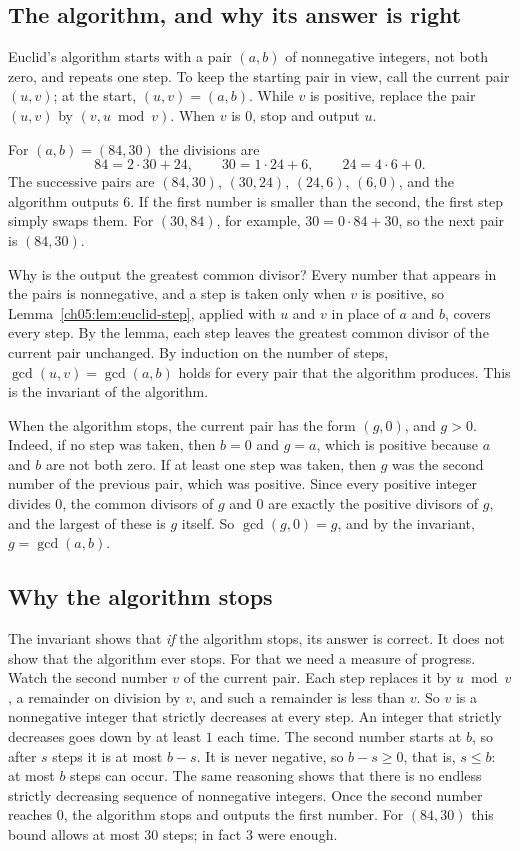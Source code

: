 \subsection*{The algorithm, and why its answer is right}
Euclid's algorithm starts with a pair $(a,b)$ of nonnegative integers, not both zero, and repeats one step. To keep the starting pair in view, call the current pair $(u,v)$; at the start, $(u,v)=(a,b)$. While $v$ is positive, replace the pair $(u,v)$ by $(v,u\bmod v)$. When $v$ is $0$, stop and output $u$.

For $(a,b)=(84,30)$ the divisions are
\[
84=2\cdot30+24,\qquad30=1\cdot24+6,\qquad24=4\cdot6+0.
\]
The successive pairs are $(84,30)$, $(30,24)$, $(24,6)$, $(6,0)$, and the algorithm outputs $6$. If the first number is smaller than the second, the first step simply swaps them. For $(30,84)$, for example, $30=0\cdot84+30$, so the next pair is $(84,30)$.

Why is the output the greatest common divisor? Every number that appears in the pairs is nonnegative, and a step is taken only when $v$ is positive, so Lemma~\ref{ch05:lem:euclid-step}, applied with $u$ and $v$ in place of $a$ and $b$, covers every step. By the lemma, each step leaves the greatest common divisor of the current pair unchanged. By induction on the number of steps, $\gcd(u,v)=\gcd(a,b)$ holds for every pair that the algorithm produces. This is the invariant of the algorithm.

When the algorithm stops, the current pair has the form $(g,0)$, and $g>0$. Indeed, if no step was taken, then $b=0$ and $g=a$, which is positive because $a$ and $b$ are not both zero. If at least one step was taken, then $g$ was the second number of the previous pair, which was positive. Since every positive integer divides $0$, the common divisors of $g$ and $0$ are exactly the positive divisors of $g$, and the largest of these is $g$ itself. So $\gcd(g,0)=g$, and by the invariant, $g=\gcd(a,b)$.

\subsection*{Why the algorithm stops}
The invariant shows that \emph{if} the algorithm stops, its answer is correct. It does not show that the algorithm ever stops. For that we need a measure of progress. Watch the second number $v$ of the current pair. Each step replaces it by $u\bmod v$, a remainder on division by $v$, and such a remainder is less than $v$. So $v$ is a nonnegative integer that strictly decreases at every step. An integer that strictly decreases goes down by at least $1$ each time. The second number starts at $b$, so after $s$ steps it is at most $b-s$. It is never negative, so $b-s\ge0$, that is, $s\le b$: at most $b$ steps can occur. The same reasoning shows that there is no endless strictly decreasing sequence of nonnegative integers. Once the second number reaches $0$, the algorithm stops and outputs the first number. For $(84,30)$ this bound allows at most $30$ steps; in fact $3$ were enough.

